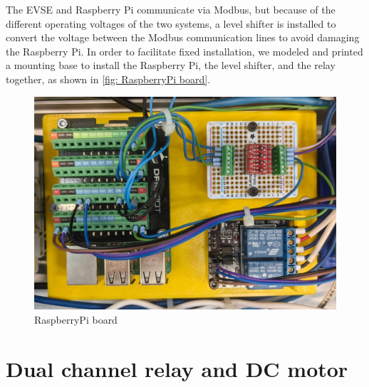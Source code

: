 \documentclass[
	english,
	ruledheaders=section,%
	class=report,%
	thesis={type=Report},%
	accentcolor=9c,%
	custommargins=true,%
	marginpar=false,%
	parskip=half-,%
	fontsize=11pt,%
	logofile={img/tuda_logo.pdf}, %
]{tudapub}
\begin{document}
The EVSE and Raspberry Pi communicate via Modbus, but because of the different operating voltages of the two systems, a level shifter is installed to convert the voltage between the Modbus communication lines to avoid damaging the Raspberry Pi. In order to facilitate fixed installation, we modeled and printed a mounting base to install the Raspberry Pi, the level shifter, and the relay together, as shown in \autoref{fig: RaspberryPi board}.

\begin{figure}[H]
        \centering
        \includegraphics[width=0.5\linewidth]{img/RaspberryPi board.jpg}
        \caption{RaspberryPi board}
        \label{fig: RaspberryPi board}
    \end{figure}

\section{Dual channel relay and DC motor}
\label{sec: relay and motor}
\end{document}
